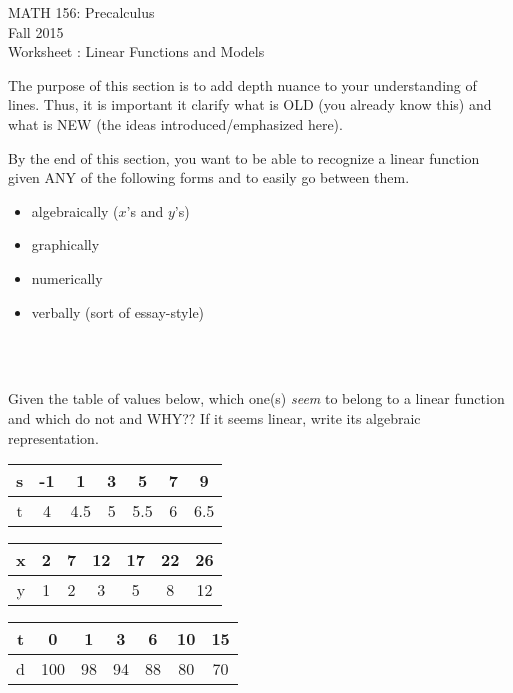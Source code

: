 \documentclass[11pt]{article}
\newcommand{\sect}{\textsection}
\begin{document}
 

\begin{center}MATH 156: Precalculus  \\ Fall 2015 \\ Worksheet \sect 2.5: Linear Functions and Models\end{center}

\hrulefill

The purpose of this section is to add depth nuance to your understanding of lines. Thus, it is important it clarify what is OLD (you already know this) and what is NEW (the ideas introduced/emphasized here).

By the end of this section, you want to be able to recognize a linear function given ANY of the following forms and to easily go between them.
\begin{itemize}
\item algebraically ($x$'s and $y$'s)
\item graphically
\item numerically
\item verbally (sort of essay-style)
\end{itemize}

\hrulefill

{}  \\


{}\\

\vspace{2in}


{} Given the table of values below, which one(s) {\it{seem}} to belong to a linear function and which do not and WHY?? If it seems linear, write its algebraic representation.\\

\vfill
\begin{tabular}{c|c|c|c|c|c|c}
s&-1 &1&3&5&7&9\\
\hline
t&4&4.5&5&5.5&6&6.5\\
\end{tabular}
\vfill

\begin{tabular}{c|c|c|c|c|c|c}
x&2&7&12&17&22&26\\
\hline
y&1&2&3&5&8&12\\
\end{tabular}
\vfill

\begin{tabular}{c|c|c|c|c|c|c}
t&0&1&3&6&10&15\\
\hline
d&100&98&94&88&80&70\\
\end{tabular}
\vfill
\end{document}
